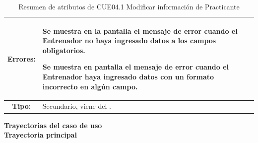 \begin{table}[H]
\centering
\begin{tabular}{| c | p{14 cm} |}
\hline
\textbf{Errores:} &	\vspace{-2mm}	%
					\begin{compactitem}
						\setlength\itemsep{-0.25em}
						\item Se muestra en la pantalla \nameref{pant:IUE04.1} el mensaje de error \nameref{msj:MSG12} cuando el Entrenador no haya ingresado datos a los campos obligatorios.
						\item Se muestra en pantalla el mensaje de error \nameref{msj:MSG13} cuando el Entrenador haya ingresado datos con un formato incorrecto en algún campo.
					\end{compactitem}\\
\hline
\textbf{Tipo:} & Secundario, viene del \nameref{cu:CUE04}.\\
\hline	
\end{tabular}
\caption{Resumen de atributos de CUE04.1 Modificar información de Practicante}
\label{tab:CUE04.1}
\end{table} 

\textbf{\textcolor[rgb]{0, 0, 0.545098}{Trayectorias del caso de uso}} \\

\textbf{\large{Trayectoria principal}}

